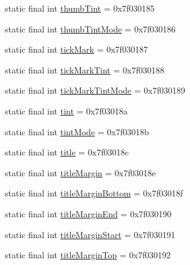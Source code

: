 \begin{DoxyCompactItemize}
\item 
static final int \mbox{\hyperlink{classcom_1_1synnapps_1_1carouselview_1_1_r_1_1attr_aa4b0533c2362e2a30bfc9354e6d09a64}{thumb\+Tint}} = 0x7f030185
\item 
static final int \mbox{\hyperlink{classcom_1_1synnapps_1_1carouselview_1_1_r_1_1attr_aada803fd9ad9f9ee7f8aa539125dc425}{thumb\+Tint\+Mode}} = 0x7f030186
\item 
static final int \mbox{\hyperlink{classcom_1_1synnapps_1_1carouselview_1_1_r_1_1attr_ad39b439569ccd9841f1972541a0c8ec4}{tick\+Mark}} = 0x7f030187
\item 
static final int \mbox{\hyperlink{classcom_1_1synnapps_1_1carouselview_1_1_r_1_1attr_a465107e196bc4fd1976e4b2832a50e8d}{tick\+Mark\+Tint}} = 0x7f030188
\item 
static final int \mbox{\hyperlink{classcom_1_1synnapps_1_1carouselview_1_1_r_1_1attr_a35c7cb022369ac624d3e2705222c2893}{tick\+Mark\+Tint\+Mode}} = 0x7f030189
\item 
static final int \mbox{\hyperlink{classcom_1_1synnapps_1_1carouselview_1_1_r_1_1attr_a903ba1f44714f318c2aeb1c82417d5d8}{tint}} = 0x7f03018a
\item 
static final int \mbox{\hyperlink{classcom_1_1synnapps_1_1carouselview_1_1_r_1_1attr_a94c2c5eebcc554e26afcfc24f5d58a4f}{tint\+Mode}} = 0x7f03018b
\item 
static final int \mbox{\hyperlink{classcom_1_1synnapps_1_1carouselview_1_1_r_1_1attr_a20d267ca665e871474e8316a38179a1f}{title}} = 0x7f03018c
\item 
static final int \mbox{\hyperlink{classcom_1_1synnapps_1_1carouselview_1_1_r_1_1attr_a486d98b52267a1707cd8dfbf01663f77}{title\+Margin}} = 0x7f03018e
\item 
static final int \mbox{\hyperlink{classcom_1_1synnapps_1_1carouselview_1_1_r_1_1attr_a76b3e9e37895ef708eae90aa4afc183a}{title\+Margin\+Bottom}} = 0x7f03018f
\item 
static final int \mbox{\hyperlink{classcom_1_1synnapps_1_1carouselview_1_1_r_1_1attr_ae9cfdafed2a739b13541130e3c99bbd0}{title\+Margin\+End}} = 0x7f030190
\item 
static final int \mbox{\hyperlink{classcom_1_1synnapps_1_1carouselview_1_1_r_1_1attr_ab4e7ac52def51e3c9831bab6b2e37b4e}{title\+Margin\+Start}} = 0x7f030191
\item 
static final int \mbox{\hyperlink{classcom_1_1synnapps_1_1carouselview_1_1_r_1_1attr_a11057ae3431622d31a14d1f12d875c8d}{title\+Margin\+Top}} = 0x7f030192
\item 

\end{DoxyCompactItemize}
